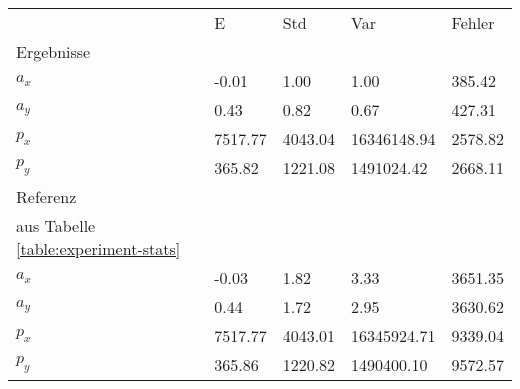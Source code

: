\begin{tabular}{l|l|l|l|l}

     & E   & Std    & Var    & Fehler \\
\hhline{=|=|=|=|=}

Ergebnisse & & & & \\
$a_x$  &        -0.01 &         1.00 &         1.00 &       385.42 \\
$a_y$  &         0.43 &         0.82 &         0.67 &       427.31 \\
$p_x$  &      7517.77 &      4043.04 &  16346148.94 &      2578.82 \\
$p_y$  &       365.82 &      1221.08 &   1491024.42 &      2668.11 \\

\hline
Referenz & & & & \\
aus Tabelle  \ref{table:experiment-stats} & & & & \\
$a_x$  &        -0.03 &         1.82 &         3.33 &      3651.35 \\
$a_y$  &         0.44 &         1.72 &         2.95 &      3630.62 \\
$p_x$  &      7517.77 &      4043.01 &  16345924.71 &      9339.04 \\
$p_y$  &       365.86 &      1220.82 &   1490400.10 &      9572.57 \\
\end{tabular}
